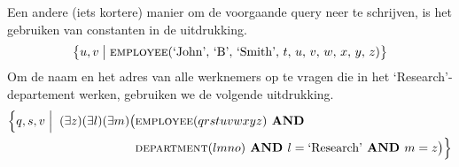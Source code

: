 Een andere (iets kortere) manier om de voorgaande query neer te schrijven, is het gebruiken van constanten in de uitdrukking.
\vspace{-2mm}
\[ \big\{ u,v \bigm| \textsc{employee}(\text{`John'},\, \text{`B'},\, \text{`Smith'},\, t,\, u,\, v,\, w,\, x,\, y,\, z) \big\} \]
Om de naam en het adres van alle werknemers op te vragen die in het `Research'-departement werken, gebruiken we de volgende uitdrukking.
\begin{align*}
\Big\{ q,s,v \Bigm| \;(\exists z)(\exists l)(\exists m) \big( &\textsc{employee}(qrstuvwxyz) \textbf{ AND } \\
&\textsc{department}(lmno) \textbf{ AND } l=\text{`Research'} \textbf{ AND } m=z \big) \Big\}
\end{align*}